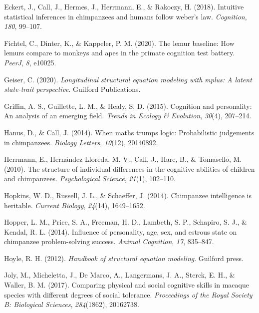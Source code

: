 \documentclass[
  man,floatsintext]{apa6}
\newlength{\cslhangindent}
\newlength{\cslentryspacingunit} %
\newenvironment{CSLReferences}[2] %
 {%
  \setlength{\parindent}{0pt}
  \ifodd #1
  \let\oldpar\par
  \def\par{\hangindent=\cslhangindent\oldpar}
  \fi
  \setlength{\parskip}{#2\cslentryspacingunit}
 }%
 {}
\begin{document}
\begin{CSLReferences}{1}{0}
\leavevmode{}%
Eckert, J., Call, J., Hermes, J., Herrmann, E., \& Rakoczy, H. (2018). Intuitive statistical inferences in chimpanzees and humans follow weber's law. \emph{Cognition}, \emph{180}, 99--107.

\leavevmode{}%
Fichtel, C., Dinter, K., \& Kappeler, P. M. (2020). The lemur baseline: How lemurs compare to monkeys and apes in the primate cognition test battery. \emph{PeerJ}, \emph{8}, e10025.

\leavevmode{}%
Geiser, C. (2020). \emph{Longitudinal structural equation modeling with mplus: A latent state-trait perspective}. Guilford Publications.

\leavevmode{}%
Griffin, A. S., Guillette, L. M., \& Healy, S. D. (2015). Cognition and personality: An analysis of an emerging field. \emph{Trends in Ecology \& Evolution}, \emph{30}(4), 207--214.

\leavevmode{}%
Hanus, D., \& Call, J. (2014). When maths trumps logic: Probabilistic judgements in chimpanzees. \emph{Biology Letters}, \emph{10}(12), 20140892.

\leavevmode{}%
Herrmann, E., Hernández-Lloreda, M. V., Call, J., Hare, B., \& Tomasello, M. (2010). The structure of individual differences in the cognitive abilities of children and chimpanzees. \emph{Psychological Science}, \emph{21}(1), 102--110.

\leavevmode{}%
Hopkins, W. D., Russell, J. L., \& Schaeffer, J. (2014). Chimpanzee intelligence is heritable. \emph{Current Biology}, \emph{24}(14), 1649--1652.

\leavevmode{}%
Hopper, L. M., Price, S. A., Freeman, H. D., Lambeth, S. P., Schapiro, S. J., \& Kendal, R. L. (2014). Influence of personality, age, sex, and estrous state on chimpanzee problem-solving success. \emph{Animal Cognition}, \emph{17}, 835--847.

\leavevmode{}%
Hoyle, R. H. (2012). \emph{Handbook of structural equation modeling}. Guilford press.

\leavevmode{}%
Joly, M., Micheletta, J., De Marco, A., Langermans, J. A., Sterck, E. H., \& Waller, B. M. (2017). Comparing physical and social cognitive skills in macaque species with different degrees of social tolerance. \emph{Proceedings of the Royal Society B: Biological Sciences}, \emph{284}(1862), 20162738.


\end{CSLReferences}
\end{document}

